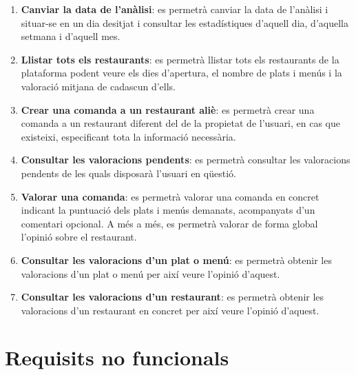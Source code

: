 \begin{enumerate}
\item \textbf{Canviar la data de l'anàlisi}: es permetrà canviar la data de l'anàlisi i situar-se en un dia desitjat i consultar les estadístiques d'aquell dia, d'aquella setmana i d'aquell mes.
\item \textbf{Llistar tots els restaurants}: es permetrà llistar tots els restaurants de la plataforma podent veure els dies d'apertura, el nombre de plats i menús i la valoració mitjana de cadascun d'ells.
\item \textbf{Crear una comanda a un restaurant aliè}: es permetrà crear una comanda a un restaurant diferent del de la propietat de l'usuari, en cas que existeixi, especificant tota la informació necessària.
\item \textbf{Consultar les valoracions pendents}: es permetrà consultar les valoracions pendents de les quals disposarà l'usuari en qüestió.
\item \textbf{Valorar una comanda}: es permetrà valorar una comanda en concret indicant la puntuació dels plats i menús demanats, acompanyats d'un comentari opcional. A més a més, es permetrà valorar de forma global l'opinió sobre el restaurant.
\item \textbf{Consultar les valoracions d'un plat o menú}: es permetrà obtenir les valoracions d'un plat o menú per així veure l'opinió d'aquest.
\item \textbf{Consultar les valoracions d'un restaurant}: es permetrà obtenir les valoracions d'un restaurant en concret per així veure l'opinió d'aquest.
\end{enumerate}
\newpage


\section{Requisits no funcionals}

